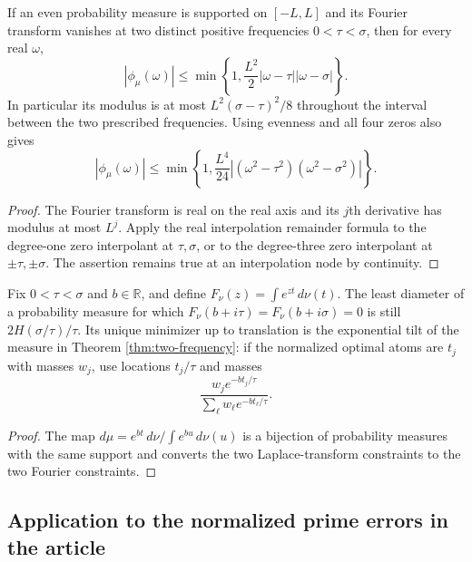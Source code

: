 \begin{proposition}
\label{prop:detuning}
If an even probability measure is supported on $[-L,L]$ and its
Fourier transform vanishes at two distinct positive frequencies
$0<\tau<\sigma$, then for every real $\omega$,
\[
 |\phi_\mu(\omega)|\le
 \min\left\{1,\frac{L^2}{2}|\omega-\tau||\omega-\sigma|\right\}.
\]
In particular its modulus is at most $L^2(\sigma-\tau)^2/8$ throughout
the interval between the two prescribed frequencies. Using evenness
and all four zeros also gives
\[
 |\phi_\mu(\omega)|\le
 \min\left\{1,\frac{L^4}{24}
       |(\omega^2-\tau^2)(\omega^2-\sigma^2)|\right\}.
\]
\end{proposition}

\begin{proof}
The Fourier transform is real on the real axis and its $j$th derivative
has modulus at most $L^j$. Apply the real interpolation remainder
formula to the degree-one zero interpolant at $\tau,\sigma$, or to
the degree-three zero interpolant at $\pm\tau,\pm\sigma$.
The assertion remains true at an interpolation node by continuity.
\end{proof}

\begin{corollary}
\label{cor:tilting}
Fix $0<\tau<\sigma$ and $b\in\mathbb R$, and define
$F_\nu(z)=\int e^{zt}\,d\nu(t)$. The least diameter of a probability
measure for which $F_\nu(b+i\tau)=F_\nu(b+i\sigma)=0$ is still
$2H(\sigma/\tau)/\tau$. Its unique minimizer up to translation is the
exponential tilt of the measure in Theorem \ref{thm:two-frequency}:
if the normalized optimal atoms are $t_j$ with masses $w_j$, use
locations $t_j/\tau$ and masses
\[
 \frac{w_j e^{-bt_j/\tau}}{\sum_\ell w_\ell e^{-bt_\ell/\tau}}.
\]
\end{corollary}

\begin{proof}
The map $d\mu=e^{bt}\,d\nu/\int e^{bu}\,d\nu(u)$ is a bijection of
probability measures with the same support and converts the two
Laplace-transform constraints to the two Fourier constraints.
\end{proof}

\subsection{Application to the normalized prime errors in the article}

